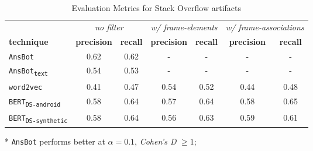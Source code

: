 \begin{table}[H]
\centering    
\begin{small}
\begin{threeparttable}
\begin{tabular}{lcccccc}


& \multicolumn{2}{c}{\textit{no filter}} 
& \multicolumn{2}{c}{\textit{w/ frame-elements}}
& \multicolumn{2}{c}{\textit{w/ frame-associations}}

\\ \cmidrule(l){2-3} \cmidrule(l){4-5} \cmidrule(l){6-7} 


\textbf{technique} & 
\textbf{precision} & \textbf{recall} &
\textbf{precision} & \textbf{recall} &
\textbf{precision} & \textbf{recall} \\ 


\hline


\texttt{AnsBot} &
0.62 & 0.62 &
- & - &
- & -
\\


\texttt{AnsBot\textsubscript{text}} &
0.54 & 0.53 &
- & - &
- & -
\\


\texttt{word2vec} &
0.41\tnote{*} & 0.47\tnote{*} &
0.54 & 0.52 &
0.44\tnote{*} &  0.48\tnote{*} 
\\


\texttt{BERT\textsubscript{DS-android}} &
0.58 & 0.64 &
0.57 & 0.64 &
0.58 & 0.65 
\\


\texttt{BERT\textsubscript{DS-synthetic}} &
0.58 & 0.64 &
0.56 & 0.63 &
0.59 & 0.61 
\\



\hline

\end{tabular}
\begin{tablenotes}
    \item[*] \texttt{AnsBot} performs better at $\alpha = 0.1$, \textit{Cohen's D} $\ge 1$;
\end{tablenotes}
\end{threeparttable}
\end{small}
\caption{Evaluation Metrics for Stack Overflow artifacts}
\label{tbl:techniques-results-stackoverflow}
\end{table}

